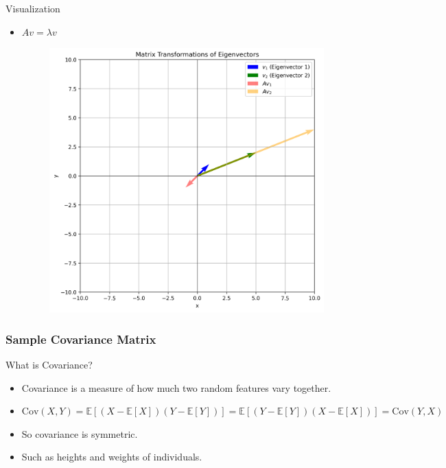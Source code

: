 \documentclass[serif, aspectratio=169]{beamer}
\begin{document}
\begin{frame}{Visualization}
    \begin{itemize}
        \item $Av = \lambda v$
        \begin{figure}[htpb]
            \begin{center}
                \includegraphics[keepaspectratio, scale=0.37]{pic/matrix_transformations.png}
            \end{center}
        \end{figure}
    \end{itemize}
\end{frame}

\subsubsection{Sample Covariance Matrix}

\begin{frame}{What is Covariance?}
    \begin{itemize}
        \item Covariance is a measure of how much two random features vary together.
        \item $ \text{Cov}(X, Y) = \mathbb{E}[(X - \mathbb{E}[X])(Y - \mathbb{E}[Y])] = \mathbb{E}[(Y - \mathbb{E}[Y]) (X - \mathbb{E}[X])] = \text{Cov}(Y, X)$
        \item So covariance is symmetric.
        \item Such as heights and weights of individuals.

    \end{itemize}
\end{frame}
\end{document}
